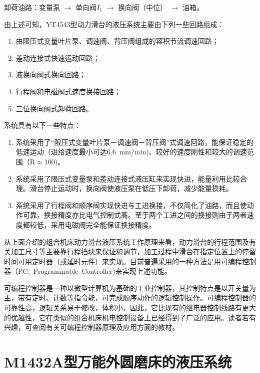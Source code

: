 卸荷油路：变量泵 $\rightarrow$ 单向阀$I_{1}$ $\rightarrow$ 换向阀（中位） $\rightarrow$ 油箱。

由上述可知，YT4543型动力滑台的液压系统主要由下列一些回路组成：

\begin{enumerate}[(1),leftmargin=0pt,itemindent=3.5\ccwd]
 \item 由限压式变量叶片泵、调速阀、背压阀组成的容积节流调速回路；
 \item 差动连接式快速运动回路；
 \item 液换向阀式换向回路；
 \item 行程阀和电磁阀式速度换接回路；
 \item 三位换向阀式卸荷回路。
\end{enumerate}

系统具有以下一些特点：

\begin{enumerate}[(1),leftmargin=0pt,itemindent=3.5\ccwd]
 \item 系统采用了“限压式变量叶片泵－调速阀－背压阀”式调速回路，能保证稳定的低速运动（进给速度最小可达6.6\ mm/min)、较好的速度刚性和较大的调速范围（R$\approx$100)。
 \item 系统采用了限压式变量泵和差动连接式液压缸来实现快进，能量利用比较合理。滑台停止运动时，换向阀使液压泵在低压下卸荷，减少能量损耗。
 \item 系统采用了行程阀和顺序阀实现快进与工进换接，不仅简化了油路，而且使动作可靠，换接精度亦比电气控制式高。至于两个工进之间的换接则由于两者速度都较低，采用电磁阀完全能保证换接精度。
\end{enumerate}

从上面介绍的组合机床动力滑台液压系统工作原理来看，动力滑台的行程范围及有关加工尺寸等主要靠行程挡块来保证和调节，加工过程中滑台在指定位置上的停留时间可用定时器（或延时元件）来实现。目前普遍采用的一种方法是用可编程控制器（PC,\ Programmable\  Controller)来实现上述功能。

可编程控制器是一种以微型计算机为基础的工业控制器，其控制特点是以开关量为主，带有定时、计数等指令能，可完成顺序动作的逻辑控制操作。可编程控制器的可靠性高，逻辑关系易于修改，体积小，因此，它比现有的继电器控制线路有更大的优越性，它在类似的组合机床机电控制设备上已经得到了广泛的应用。读者若有兴趣，可查阅有关可编程控制器原理及应用方面的教材。

\section  {M1432A型万能外圆磨床的液压系统}


